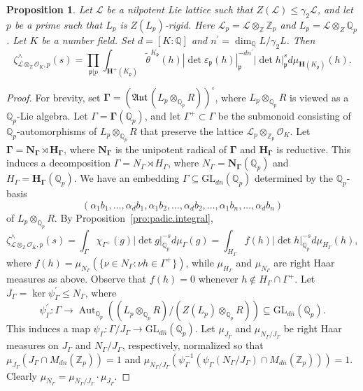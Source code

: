 \documentclass[11pt,a4paper]{amsart}
\theoremstyle{plain}
\newtheorem{pro}[thm]{Proposition}
\theoremstyle{remark}
\newcommand{\Z}{\mathbb{Z}}
\newcommand{\Q}{\mathbb{Q}}
\newcommand{\tensor}{\otimes}
\newcommand{\p}{\mathfrak{p}}
\newcommand{\dimL}{n}
\newcommand{\overdim}{\overline{n}}
\DeclareMathOperator{\Aut}{Aut}
\def \aAut {\mathfrak{Aut} \,}
\def \p {\ensuremath{\mathfrak{p}}}
\begin{document}
\begin{pro} \label{pro:rigid.computation}
Let $\mathcal{L}$ be a nilpotent Lie lattice such that $Z(\mathcal L) \leq \gamma_2 \mathcal L$, and let $p$ be a prime such that $L_p$ is $Z(L_p)$-rigid.  Here $\mathcal{L}_p = \mathcal{L} \tensor_\Z \Z_p$ and $L_p = \mathcal{L} \tensor_Z \Q_p$.  Let $K$ be a number field.  Set $d = [K:\Q]$ and $\dimL^\prime = \dim_{\Q} L/\gamma_2 L$.
Then
\begin{equation*} \label{equ:integral.factors}
 \zeta^\wedge_{\mathcal{L} \tensor_\Z \mathcal{O}_K, p}(s) = \prod_{\p | p} \int_{\mathbf{H}^+(K_\p)} \widetilde{\theta}^{K_\p}(h) |\det \varepsilon_\p(h)|_{\p}^{-d \dimL^\prime} |\det h|^s_{\p} d \mu_{\mathbf{H}(K_\p)}(h). 
 \end{equation*}
\end{pro}
\begin{proof}
For brevity, set $\boldsymbol{\Gamma} = (\aAut (L_p \tensor_{\Q_p} R))^\circ$, where $L_p \tensor_{\Q_p} R$ is viewed as a $\Q_p$-Lie algebra.  
Let $\Gamma = \boldsymbol{\Gamma}(\Q_p)$,
and let $\Gamma^+ \subset \Gamma$ be the submonoid consisting of $\Q_p$-automorphisms of $L_p \tensor_{\Q_p} R$ that preserve the lattice $\mathcal{L}_p \tensor_{\Z_p} \mathcal{O}_K$.  
Let $\boldsymbol{\Gamma} = \mathbf{N}_{\boldsymbol{\Gamma}} \rtimes \mathbf{H}_{\boldsymbol{\Gamma}}$, where $\mathbf{N}_{\boldsymbol{\Gamma}}$ is the unipotent radical of $\boldsymbol{\Gamma}$ and $\mathbf{H}_{\boldsymbol{\Gamma}}$ is reductive.  This induces a decomposition
$\Gamma = N_\Gamma \rtimes H_\Gamma$, where $N_\Gamma = \mathbf{N}_{\boldsymbol{\Gamma}}(\Q_p)$ and $H_\Gamma = \mathbf{H}_{\boldsymbol{\Gamma}}(\Q_p)$.  We have an embedding $\Gamma \subseteq \mathrm{GL}_{d \dimL}(\Q_p)$ determined by the $\Q_p$-basis
$$(\alpha_1 b_1, \dots, \alpha_d b_1, \alpha_1 b_2, \dots, \alpha_d b_2, \dots, \alpha_1 b_{\dimL}, \dots, \alpha_d b_{\dimL})$$ 
of $L_p \tensor_{\Q_p} R$.  
By Proposition~\ref{pro:padic.integral},
\begin{equation} \label{equ:separate.variables}
\zeta^\wedge_{\mathcal{L} \tensor_\Z \mathcal{O}_K, p}(s) = \int_\Gamma \chi_{\Gamma^+}(g) |\det g|_{\Q_p}^{-s} d \mu_{\Gamma}(g) = \int_{H_\Gamma}  f(h) | \det h|_{\Q_p}^{-s}  d \mu_{H_\Gamma}(h),
\end{equation}
where $f(h) = \mu_{N_\Gamma} (\{ \nu \in N_\Gamma : \nu h \in \Gamma^+ \})$, while $\mu_{H_\Gamma}$ and $\mu_{N_\Gamma}$ are right Haar measures as above.  Observe that $f(h) = 0$ whenever $h \not\in H_\Gamma \cap \Gamma^+$.  Let $J_\Gamma = \ker \psi^\prime_\Gamma \leq N_\Gamma$, where
$$\psi_\Gamma^\prime: \Gamma \to \Aut_{\Q_p} ((L_p \tensor_{\Q_p} R)/(Z(L_p) \tensor_{\Q_p} R)) \subseteq \mathrm{GL}_{d \overdim}(\Q_p).$$  
This induces a map $\psi_\Gamma : \Gamma / J_\Gamma \to \mathrm{GL}_{d \overdim}(\Q_p)$.  Let $\mu_{J_\Gamma}$ and $\mu_{N_\Gamma / J_\Gamma}$ be right Haar measures on $J_\Gamma$ and $N_\Gamma / J_\Gamma$, respectively, normalized so that $\mu_{J_\Gamma}(J_\Gamma \cap M_{d \dimL}(\Z_p)) = 1$ and $\mu_{N_\Gamma / J_\Gamma}(\psi_\Gamma^{-1}(\psi_\Gamma(N_\Gamma / J_\Gamma) \cap M_{d \overdim}(\Z_p))) = 1$.  
Clearly $\mu_{N_\Gamma} = \mu_{N_\Gamma / J_\Gamma} \cdot \mu_{J_\Gamma}$.  


\end{proof}
\end{document}
